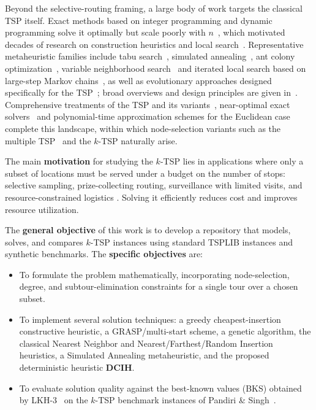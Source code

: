 \documentclass[conference]{IEEEtran}
\begin{document}
\vspace{2pt}
Beyond the selective-routing framing, a large body of work targets the classical TSP itself. Exact methods based on integer programming and dynamic programming solve it optimally but scale poorly with $n$~\cite{dantzig1954,bellman1962,heldkarp1962,karp1972}, which motivated decades of research on construction heuristics and local search~\cite{lin1965,christofides1976,bentley1992,johnson1997,laporte1992}. Representative metaheuristic families include tabu search~\cite{glover1986}, simulated annealing~\cite{cerny1985}, ant colony optimization~\cite{dorigo1997acs}, variable neighborhood search~\cite{mladenovic1997vns} and iterated local search based on large-step Markov chains~\cite{martin1991}, as well as evolutionary approaches designed specifically for the TSP~\cite{potvin1996}; broad overviews and design principles are given in~\cite{blumroli2003,talbi2009}. Comprehensive treatments of the TSP and its variants~\cite{gutin2007book}, near-optimal exact solvers~\cite{applegate2006concorde} and polynomial-time approximation schemes for the Euclidean case~\cite{arora1998} complete this landscape, within which node-selection variants such as the multiple TSP~\cite{bektas2006} and the $k$-TSP naturally arise.

\vspace{2pt}
The main \textbf{motivation} for studying the $k$-TSP lies in applications where only a subset of locations must be served under a budget on the number of stops: selective sampling, prize-collecting routing, surveillance with limited visits, and resource-constrained logistics \cite{vansteenwegen2011top,blanchard2023}. Solving it efficiently reduces cost and improves resource utilization.

\vspace{2pt}
The \textbf{general objective} of this work is to develop a repository that models, solves, and compares $k$-TSP instances using standard TSPLIB instances and synthetic benchmarks. The \textbf{specific objectives} are:
\begin{itemize}
    \item To formulate the problem mathematically, incorporating node-selection, degree, and subtour-elimination constraints for a single tour over a chosen subset.
    \item To implement several solution techniques: a greedy cheapest-insertion constructive heuristic, a GRASP/multi-start scheme, a genetic algorithm, the classical Nearest Neighbor and Nearest/Farthest/Random Insertion heuristics, a Simulated Annealing metaheuristic, and the proposed deterministic heuristic \textbf{DCIH}.
    \item To evaluate solution quality against the best-known values (BKS) obtained by LKH-3~\cite{Helsgaun,lin1973} on the $k$-TSP benchmark instances of Pandiri \& Singh~\cite{pandiri2020}.
\end{itemize}
\end{document}
